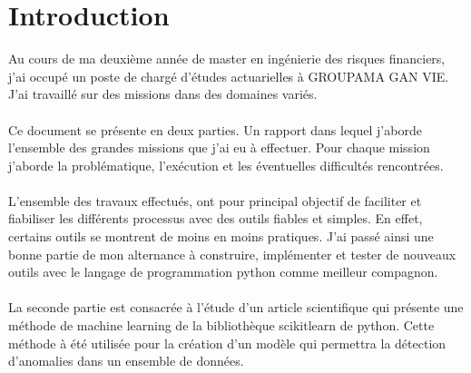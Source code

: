 \chapter*{Introduction}
Au cours de ma deuxième année de master en ingénierie des risques financiers, j'ai occupé un poste de chargé d'études actuarielles à GROUPAMA GAN VIE. J'ai travaillé sur des missions dans des domaines variés.
\\
\\
Ce document se présente en deux parties. Un rapport dans lequel j'aborde l'ensemble des grandes missions que j'ai eu à effectuer. Pour chaque mission j'aborde la problématique, l'exécution et les éventuelles difficultés rencontrées.
\\
\\
L'ensemble des travaux effectués, ont pour principal objectif de faciliter et fiabiliser les différents processus avec des outils fiables et simples. En effet, certains outils se montrent de moins en moins pratiques. J'ai passé ainsi une bonne partie de mon alternance à construire, implémenter et tester de nouveaux outils avec le langage de programmation python comme meilleur compagnon.
\\
\\
La seconde partie est consacrée à l'étude d'un article scientifique qui présente une méthode de machine learning de la bibliothèque scikitlearn de python. Cette méthode à été utilisée pour la création d'un modèle qui permettra la détection d'anomalies dans un ensemble de données.



